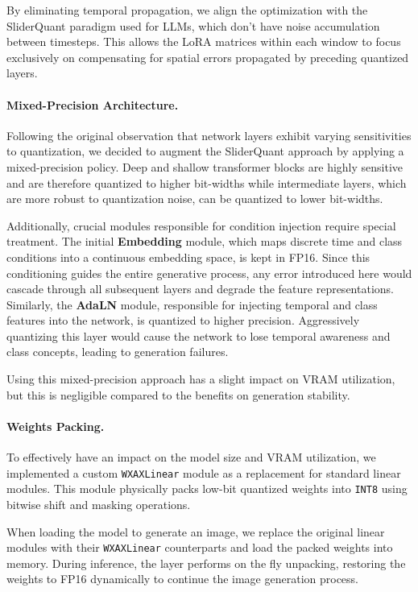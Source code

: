 \documentclass{article}
\begin{document}
By eliminating temporal propagation, we align the optimization with the SliderQuant paradigm used for LLMs, which don't have noise accumulation between timesteps.
This allows the LoRA matrices within each window to focus exclusively on compensating for spatial errors propagated by preceding quantized layers.

\paragraph{Mixed-Precision Architecture.}

Following the original observation that network layers exhibit varying sensitivities to quantization, we decided to augment the SliderQuant approach by applying a mixed-precision policy.
Deep and shallow transformer blocks are highly sensitive and are therefore quantized to higher bit-widths while intermediate layers, which are more robust to quantization noise, can be quantized to lower bit-widths.

Additionally, crucial modules responsible for condition injection require special treatment. 
The initial \textbf{Embedding} module, which maps discrete time and class conditions into a continuous embedding space, is kept in FP16.
Since this conditioning guides the entire generative process, any error introduced here would cascade through all subsequent layers and degrade the feature representations.
Similarly, the \textbf{AdaLN} module, responsible for injecting temporal and class features into the network, is quantized to higher precision. Aggressively quantizing this layer would cause the network to lose temporal awareness and class concepts, leading to generation failures.

Using this mixed-precision approach has a slight impact on VRAM utilization, but this is negligible compared to the benefits on generation stability.

\paragraph{Weights Packing.}

To effectively have an impact on the model size and VRAM utilization, we implemented a custom \texttt{WXAXLinear} module as a replacement for standard linear modules.
This module physically packs low-bit quantized weights into \texttt{INT8} using bitwise shift and masking operations.

When loading the model to generate an image, we replace the original linear modules with their \texttt{WXAXLinear} counterparts and load the packed weights into memory.
During inference, the layer performs on the fly unpacking, restoring the weights to FP16 dynamically to continue the image generation process.
\end{document}
